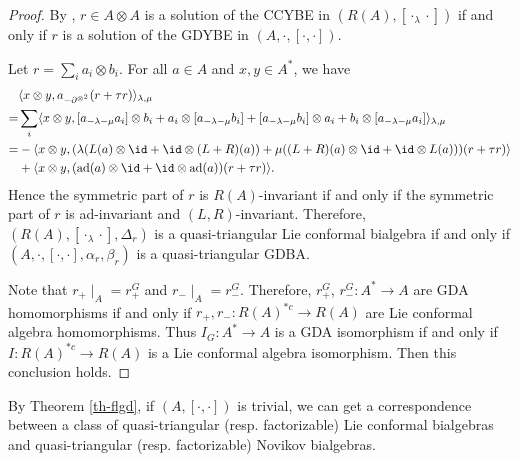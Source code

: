 \documentclass[12pt]{amsart}
\begin{document}
\begin{proof}
    By \cite[Proposition 3.18]{HBG},  $r\in A\otimes A$  is a solution of the CCYBE in $( R(A),[\cdot_\lambda\cdot])$ if and only if $r$ is a solution of the GDYBE in $(A,\cdot,[\cdot,\cdot])$.
 
    Let $r=\sum_i a_i\otimes b_i$. For all $a\in A$ and $x,y\in A^*$, we have
    \begin{align*}
        &\langle x\otimes y,a_{-\partial^{\otimes^2}} (r+\tau r)\rangle _{\lambda,\mu}\\
        =&\sum_i \langle x\otimes y, [a_{-\lambda-\mu}a_i]\otimes b_i+a_i\otimes [a_{-\lambda-\mu} b_i]+[a_{-\lambda-\mu}b_i]\otimes a_i+b_i\otimes [a_{-\lambda-\mu} a_i]\rangle_{\lambda,\mu}\\
        =&-\langle x\otimes y,(\lambda(L(a)\otimes \id+\id\otimes (L+R)(a))+\mu( (L+R)(a)\otimes \id+\id\otimes L(a))) (r+\tau r) \rangle\\
        &+\langle x\otimes y,({\rm ad}(a)\otimes \id+\id\otimes {\rm ad}(a))(r+\tau
        r)\rangle.
    \end{align*}
   Hence the symmetric part of $r$ is $ R(A)$-invariant if and only if the symmetric part of $r$ is {\rm ad}-invariant and $(L,R)$-invariant. Therefore, $( R(A),[\cdot_\lambda\cdot],\Delta_r)$ is a quasi-triangular Lie conformal bialgebra if and only if $(A,\cdot,[\cdot,\cdot],\alpha_r,\beta_r)$ is a quasi-triangular GDBA.

    Note that $r_+\mid_A =r^G_+$ and $r_-\mid_A=r^G_-$. Therefore, $r^G_+$, $r^G_-:A^*\rightarrow A$ are GDA homomorphisms if and only if $r_+,r_-: R(A)^{*c}\rightarrow  R(A)$ are Lie conformal algebra homomorphisms. Thus $I_G:A^*\rightarrow A$ is a GDA isomorphism if and only if $I : R(A)^{*c}\rightarrow  R(A)$ is a Lie conformal algebra isomorphism. Then this conclusion holds.
\end{proof}
\begin{remark}
    By Theorem \ref{th-flgd}, if $(A, [\cdot,\cdot])$ is trivial, we can get a correspondence between a class of quasi-triangular (resp. factorizable) Lie conformal bialgebras  and quasi-triangular (resp. factorizable) Novikov bialgebras.  
\end{remark}




 
\end{document}
